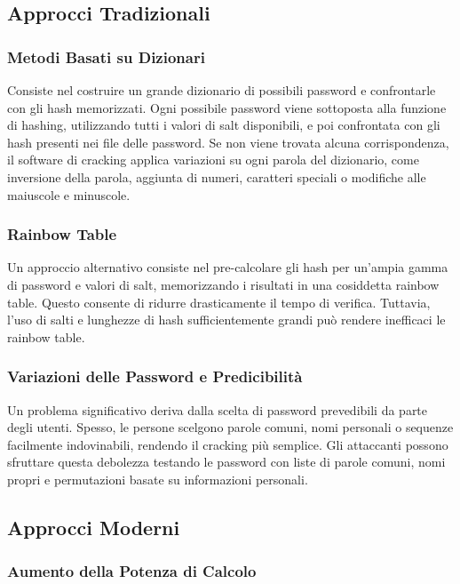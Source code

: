 \subsection{Approcci Tradizionali}

\subsubsection{Metodi Basati su Dizionari}

Consiste nel costruire un grande dizionario di possibili password e confrontarle con gli hash memorizzati. Ogni possibile password viene sottoposta alla funzione di hashing, utilizzando tutti i valori di salt disponibili, e poi confrontata con gli hash presenti nei file delle password. Se non viene trovata alcuna corrispondenza, il software di cracking applica variazioni su ogni parola del dizionario, come inversione della parola, aggiunta di numeri, caratteri speciali o modifiche alle maiuscole e minuscole.

\subsubsection{Rainbow Table}

Un approccio alternativo consiste nel pre-calcolare gli hash per un'ampia gamma di password e valori di salt, memorizzando i risultati in una cosiddetta rainbow table. Questo consente di ridurre drasticamente il tempo di verifica. Tuttavia, l'uso di salti e lunghezze di hash sufficientemente grandi può rendere inefficaci le rainbow table.

\subsubsection{Variazioni delle Password e Predicibilità}

Un problema significativo deriva dalla scelta di password prevedibili da parte degli utenti. Spesso, le persone scelgono parole comuni, nomi personali o sequenze facilmente indovinabili, rendendo il cracking più semplice. Gli attaccanti possono sfruttare questa debolezza testando le password con liste di parole comuni, nomi propri e permutazioni basate su informazioni personali.

\subsection{Approcci Moderni}

\subsubsection{Aumento della Potenza di Calcolo}

